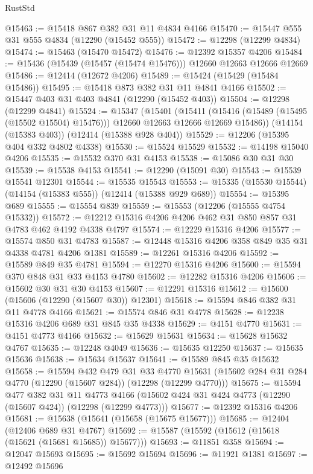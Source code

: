 \begin{lexlean}{RustStd}
\begin{coremodule}
@15463 := @15418 @867 @382 @31 @11 @4834 @4166
@15470 := @15447 @555 @31 @555 @4834 (@12290 (@15452 @555))
@15472 := @12298 (@12299 @4834)
@15474 := @15463 (@15470 @15472)
@15476 := @12392 @15357 @4206
@15484 := @15436 (@15439 (@15457 (@15474 @15476))) @12660 @12663 @12666 @12669
@15486 := @12414 (@12672 @4206)
@15489 := @15424 (@15429 (@15484 @15486))
@15495 := @15418 @873 @382 @31 @11 @4841 @4166
@15502 := @15447 @403 @31 @403 @4841 (@12290 (@15452 @403))
@15504 := @12298 (@12299 @4841)
@15524 := @15347
    (@15401
      (@15411 (@15416 (@15489 (@15495 (@15502 @15504) @15476))) @12660 @12663 @12666 @12669 @15486))
    (@14154 (@15383 @403))
    (@12414 (@15388 @928 @404))
@15529 := @12206 (@15395 @404 @332 @4802 @4338)
@15530 := @15524 @15529
@15532 := @14198 @15040 @4206
@15535 := @15532 @370 @31 @4153
@15538 := @15086 @30 @31 @30
@15539 := @15538 @4153
@15541 := @12290 (@15091 @30)
@15543 := @15539 @15541 @12301
@15544 := @15535 @15543
@15553 := @15335 (@15530 @15544) (@14154 (@15383 @555)) (@12414 (@15388 @929 @689))
@15554 := @15395 @689
@15555 := @15554 @839
@15559 := @15553 (@12206 (@15555 @4754 @15332))
@15572 := @12212 @15316 @4206 @4206 @462 @31 @850 @857 @31 @4783 @462 @4192 @4338 @4797
@15574 := @12229 @15316 @4206
@15577 := @15574 @850 @31 @4783
@15587 := @12448 @15316 @4206 @358 @849 @35 @31 @4338 @4781 @4206 @1381
@15589 := @12261 @15316 @4206
@15592 := @15589 @849 @35 @4781
@15594 := @12270 @15316 @4206
@15600 := @15594 @370 @848 @31 @33 @4153 @4780
@15602 := @12282 @15316 @4206
@15606 := @15602 @30 @31 @30 @4153
@15607 := @12291 @15316
@15612 := @15600 (@15606 (@12290 (@15607 @30)) @12301)
@15618 := @15594 @846 @382 @31 @11 @4778 @4166
@15621 := @15574 @846 @31 @4778
@15628 := @12238 @15316 @4206 @689 @31 @845 @35 @4338
@15629 := @4151 @4770
@15631 := @4151 @4773 @4166
@15632 := @15629 @15631
@15634 := @15628 @15632 @4767
@15635 := @12248 @4049
@15636 := @15635 @12250
@15637 := @15635 @15636
@15638 := @15634 @15637
@15641 := @15589 @845 @35 @15632
@15658 := @15594
    @432
    @479
    @31
    @33
    @4770
    @15631
    (@15602 @284 @31 @284 @4770 (@12290 (@15607 @284)) (@12298 (@12299 @4770)))
@15675 := @15594
    @477
    @382
    @31
    @11
    @4773
    @4166
    (@15602 @424 @31 @424 @4773 (@12290 (@15607 @424)) (@12298 (@12299 @4773)))
@15677 := @12392 @15316 @4206
@15681 := @15638 (@15641 (@15658 (@15675 @15677)))
@15685 := @12404 (@12406 @689 @31 @4767)
@15692 := @15587 (@15592 (@15612 (@15618 (@15621 (@15681 @15685)) @15677)))
@15693 := @11851 @358
@15694 := @12047 @15693
@15695 := @15692 @15694
@15696 := @11921 @1381
@15697 := @12492 @15696

\end{coremodule}
\end{lexlean}
